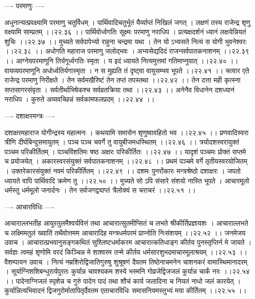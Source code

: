 \documentclass[11pt]{book}
\begin{document}
\begin{landscape}
---- परमाणुः ----

अधुनान्यत्प्रवक्ष्यामि परमाणु चतुर्विधम् ।
पार्थिवादिचतुर्भूतं यैर्व्याप्तं निखिलं जगत् ।
लक्षणं तस्य राजेन्द्र शृणु वक्ष्यामि साम्प्रतम् ।।२२.३६ ।।
पार्थिवोर्ध्वगतिः सूक्ष्मः परमाणु नराधिप ।
प्रत्यक्षदर्शनं ध्यानं लक्षयेन्नियतं शुचिः ।।२२.३७ ।।
मुच्यते सर्वपापेभ्यो राहुना चन्द्रमा यथा ।
तेन यो ऽभ्यसते नित्यं स योगी भुवनेश्वरः ।।२२.३८ ।।
अधोगति महाराज परमाणु जलोद्भवः ।
अभ्यसेद्यदिदं राजन्सर्वपातकनाशनम् ।।२२.३९ ।।
आग्नेयपरमाणूनि तिर्यगूर्ध्वगतिः स्मृता ।
य इदं ध्यायते नित्यमुत्तमां गतिमाप्नुयात् ।।२२.४० ।।
वायव्यपरमाणूनि अधोर्ध्वतिर्यगास्मृता ।
न स मुह्यति तं दृष्ट्वा वायुसम्भव भूपते ।।२२.४१ ।।
चत्वार एते राजेन्द्र परमाणु निरीक्षते ।
तेन सर्वमखैरिष्टं तेन तप्तं तपस्तथा ।।२२.४२ ।।
तेन दत्ता मही कृत्स्ना सप्तसागरसंवृता ।
सर्वतीर्थाभिषेकश्च सर्वव्रतक्रिया तथा ।।२२.४३ ।।
अनेनैव विधानेन दशध्यानं नराधिप ।
कुरुते अव्यवच्छिन्नं सर्वकामफलप्रदम् ।।२२.४४ ।।

---- दशाक्षरमन्त्रः ----

दशाक्षरमहाराज योगीन्द्रस्य महात्मनः ।
कथयामि समासेन शृणुष्वावहितो भव ।।२२.४५ ।।
प्रणवादिस्वरा त्रीणि दीर्घबिन्दुसमायुतम् ।
पञ्च पञ्च चवर्गे तु वायुबीजमधस्थितम् ।।२२.४६ ।।
त्रयोदशस्वरायुक्तं पञ्चम परिकीर्तितम् ।
पञ्चविंशतिमः षष्ठ अक्षरः परिकीर्तितः ।।२२.४७ ।।
यादृशं पञ्चमः प्रोक्तं सप्तमे च प्रयोजयेत् ।
अकारस्वरसंयुक्तं सर्वपातकनाशनम् ।।२२.४८ ।।
प्रथमं पञ्चमे वर्गे तृतीयस्वरयोजितम् ।
उक्तरेकारसंयुक्तं नवमं परिकीर्तितम् ।।२२.४९ ।।
दशमः पुनरोंकारः मन्त्रश्रेष्ठो दशाक्षरः ।
जपतो ध्यायते वापि पार्थिवादि क्रमेण तु ।।२२.५० ।।
मुच्यते सो ऽपि संसारे संशयो नास्ति भूपते ।
आचारमूलो धर्मस्तु धर्ममूलो जनार्दनः ।
तेन सर्वजगद्व्याप्तं त्रैलोक्यं स चराचरं ।।२२.५१ ।।

---- आचारविधिः ----

आचाराल्लभतीह आयुरतुलमैश्वर्यवित्तं तथा
आचारात्सुतमीप्सितं च लभते श्रीकीर्तिप्रज्ञायशः ।
आचाराल्लभते च लक्ष्मिमतुलं ख्यातिं तथैवोत्तमम
आचारादिह मन्त्रधर्मपरमं प्राप्नोति निःसंशयम् ।।२२.५२ ।।
जनमेजय उवाच ।
आचारात्प्रभवानुसङ्गकथितं सुश्लिष्टधर्माकरम
आचारात्कतिधाङ्ग कीर्तय पुनस्तृप्तिर्न मे जायते ।
सर्वज्ञः त्वमहं शृणोमि वरदं किञ्चिन्न मे शाश्वरम
तन्मे कीर्तय धर्मसारशुभदमाचारमूलाश्रयम् ।।२२.५३ ।।
वैशम्पायन उवाच ।
नित्यं नम्रशिरोद्विजातिगुरुषु शुश्रूषणं दैवतम
तिष्ठेनाचमनेन चाशनकरं वामास्थिमानादरम् ।
सूर्याग्निशशिबन्धुरार्यपुरतः कुर्यान्न चावश्यकम
शस्ये भस्मनि गोव्रजेद्विजजलं कुर्यान्न चार्कं नरः ।।२२.५४ ।।
पादेनाग्निजलं स्पृशेन्न च गुरुं पादेन पादं तथा
शौचं कार्य जलादिना च नियतं नाधो जलं कारयेत् ।
कुर्यान्नित्यभिवादनं द्विजगुरोर्मातापितृर्दैवतम
एताचारविधिः समासनियमस्तुभ्यं मया कीर्तितम् ।।२२.५५ ।।


\end{landscape}
\end{document}
